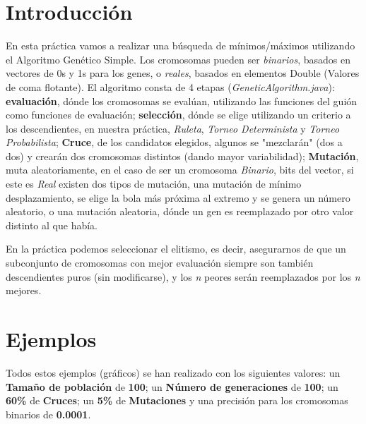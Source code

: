 \documentclass{article}
\begin{document}
\section{Introducción}
En esta práctica vamos a realizar una búsqueda de mínimos/máximos utilizando el Algoritmo Genético Simple. Los cromosomas pueden ser \textit{binarios}, basados en vectores de 0s y 1s para los genes, o \textit{reales}, basados en elementos Double (Valores de coma flotante). El algoritmo consta de 4 etapas (\textit{GeneticAlgorithm.java}): \textbf{evaluación}, dónde los cromosomas se evalúan, utilizando las funciones del guión como funciones de evaluación; \textbf{selección}, dónde se elige utilizando un criterio a los descendientes, en nuestra práctica, \textit{Ruleta}, \textit{Torneo Determinista} y \textit{Torneo Probabilista}; \textbf{Cruce}, de los candidatos elegidos, algunos se "mezclarán" (dos a dos) y crearán dos cromosomas distintos (dando mayor variabilidad); \textbf{Mutación}, muta aleatoriamente, en el caso de ser un cromosoma \textit{Binario}, bits del vector, si este es \textit{Real} existen dos tipos de mutación, una mutación de mínimo desplazamiento, se elige la bola más próxima al extremo y se genera un número aleatorio, o una mutación aleatoria, dónde un gen es reemplazado por otro valor distinto al que había.

En la práctica podemos seleccionar el elitismo, es decir, asegurarnos de que un subconjunto de cromosomas con mejor evaluación siempre son también descendientes puros (sin modificarse), y los \textit{n} peores serán reemplazados por los \textit{n} mejores.

\newpage

\section{Ejemplos}
Todos estos ejemplos (gráficos) se han realizado con los siguientes valores: un \textbf{Tamaño de población} de \textbf{100}; un \textbf{Número de generaciones} de \textbf{100}; un \textbf{60\%} de \textbf{Cruces}; un \textbf{5\%} de \textbf{Mutaciones} y una precisión para los cromosomas binarios de \textbf{0.0001}.
\end{document}

